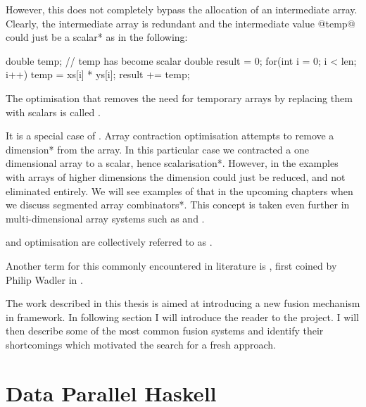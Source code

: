 \documentclass[preamble.tex]{subfiles}
\begin{document}
However, this does not completely bypass the allocation of an intermediate array\iintermediate{}. Clearly, the intermediate array is redundant and the intermediate value @temp@ could just be a \*scalar* as in the following:


\begin{ccode}
double temp; // temp has become scalar
double result = 0;
for(int i = 0; i < len; i++) {
	temp = xs[i] * ys[i];
	result += temp;
}
\end{ccode}


\begin{bluebox}
The optimisation that removes the need for temporary arrays by replacing them with scalars is called .
\end{bluebox}


It is a special case of . Array contraction optimisation attempts to remove a \*dimension* from the array. In this particular case we contracted a one dimensional array to a scalar, hence \*scalarisation*. However, in the examples with arrays of higher dimensions the dimension could just be reduced, and not eliminated entirely. We will see examples of that in the upcoming chapters when we discuss \*segmented array combinators*\isegmented. This concept is taken even further in multi-dimensional array systems such as  \cite{KCL+10} and  \cite{CKL+11}.

\begin{bluebox}
 and  optimisation are collectively referred to as .
\end{bluebox}

Another term for this commonly encountered in literature is , first coined by Philip Wadler in \cite{Wad90}.

The work described in this thesis is aimed at introducing a new fusion mechanism in \idph{} framework. In following section I will introduce the reader to the \DPH project. I will then describe some of the most common fusion systems and identify their shortcomings which motivated the search for a fresh approach.

\clearpage

\section{Data Parallel Haskell}
\label{sec:DPH}
\end{document}
